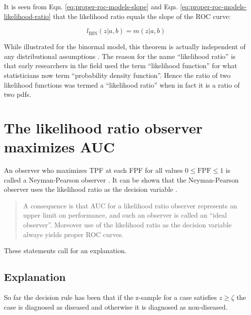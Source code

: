 \documentclass[
]{book}
\begin{document}
It is seen from Eqn. \eqref{eq:proper-roc-models-slope} and Eqn. \eqref{eq:proper-roc-models-likelihood-ratio} that the likelihood ratio equals the slope of the ROC curve:

\begin{equation} 
l_{\text{BIN}}\left( z | a,b\right) = m\left( z | a,b\right)
\label{eq:proper-roc-models-likelihood-ratio-theorem}
\end{equation}

While illustrated for the binormal model, this theorem is actually independent of any distributional assumptions \citep{Egan1975}. The reason for the name ``likelihood ratio'' is that early researchers in the field used the term ``likelihood function'' for what statisticians now term ``probability density function''. Hence the ratio of two likelihood functions was termed a ``likelihood ratio'' when in fact it is a ratio of two pdfs.

\hypertarget{proper-roc-models-likelihood-ratio-theorem2}{%
\section{The likelihood ratio observer maximizes AUC}\label{proper-roc-models-likelihood-ratio-theorem2}}

An observer who maximizes TPF at each FPF for all values \(0 \le \text{FPF} \le 1\) is called a Neyman-Pearson observer \citep{neyman1933ix}. It can be shown that the Neyman-Pearson observer uses the likelihood ratio as the decision variable \citep{green1966signal}.

\begin{quote}
A consequence is that AUC for a likelihood ratio observer represents an upper limit on performance, and such an observer is called an ``ideal observer''. Moreover use of the likelihood ratio as the decision variable always yields proper ROC curves.
\end{quote}

These statements call for an explanation.

\hypertarget{explanation}{%
\subsection{Explanation}\label{explanation}}

So far the decision rule has been that if the z-sample for a case satisfies \(z \ge \zeta\) the case is diagnosed as diseased and otherwise it is diagnosed as non-diseased.
\end{document}
